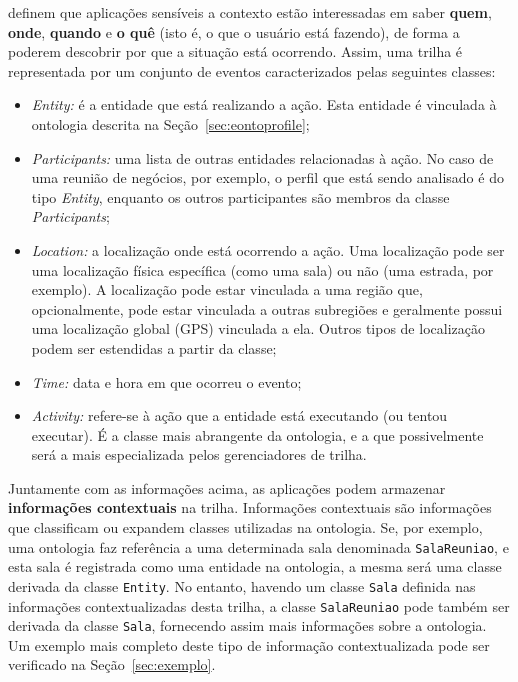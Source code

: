  definem que aplicações sensíveis a contexto estão interessadas em saber {\bf quem}, {\bf onde}, {\bf quando} e {\bf o quê} (isto é, o que o usuário está fazendo), de forma a poderem descobrir por que a situação está ocorrendo. Assim, uma trilha é representada por um conjunto de eventos caracterizados pelas seguintes classes:

\begin{itemize}

  \item {\em Entity:} é a entidade que está realizando a ação. Esta entidade é vinculada à ontologia descrita na Seção~\ref{sec:eontoprofile};

  \item {\em Participants:} uma lista de outras entidades relacionadas à ação. No caso de uma reunião de negócios, por exemplo, o perfil que está sendo analisado é do tipo {\em Entity}, enquanto os outros participantes são membros da classe {\em Participants};

  \item {\em Location:} a localização onde está ocorrendo a ação. Uma localização pode ser uma localização física específica (como uma sala) ou não (uma estrada, por exemplo). A localização pode estar vinculada a uma região que, opcionalmente, pode estar vinculada a outras subregiões e geralmente possui uma localização global (GPS) vinculada a ela. Outros tipos de localização podem ser estendidas a partir da classe;

  \item {\em Time:} data e hora em que ocorreu o evento;

  \item {\em Activity:} refere-se à ação que a entidade está executando (ou tentou executar). É a classe mais abrangente da ontologia, e a que possivelmente será a mais especializada pelos gerenciadores de trilha.

\end{itemize}


Juntamente com as informações acima, as aplicações podem armazenar \textbf{informações contextuais} na trilha. Informações contextuais são informações que classificam ou expandem classes utilizadas na ontologia. Se, por exemplo, uma ontologia faz referência a uma determinada sala denominada \texttt{SalaReuniao}, e esta sala é registrada como uma entidade na ontologia, a mesma será uma classe derivada da classe \texttt{Entity}. No entanto, havendo um classe \texttt{Sala} definida nas informações contextualizadas desta trilha, a classe \texttt{SalaReuniao} pode também ser derivada da classe \texttt{Sala}, fornecendo assim mais informações sobre a ontologia. Um exemplo mais completo deste tipo de informação contextualizada pode ser verificado na Seção~\ref{sec:exemplo}.

